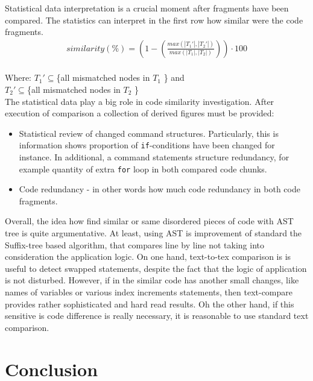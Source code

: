 \documentclass{report}
\begin{document}
Statistical data interpretation is a crucial moment after fragments have been compared. The statistics can interpret in the first row how similar were the code fragments. \\
\begin{gather*}
similarity(\%) =  \left ( 1 - \left (\frac{max(|T_{1}'|, |T_{2}'|)}{max(|T_{1}|, |T_{2}|)} \right ) \right )\cdot 100 
\end{gather*} \\
Where: $T_{1}' \subseteq $\{all mismatched nodes in $T_{1}$ \} and \\$T_{2}' \subseteq $\{all mismatched nodes in $T_{2}$ \}
\\
The statistical data play a big role in code similarity investigation. After execution of comparison a collection of derived figures must be provided:
\begin{itemize}
	\item Statistical review of changed command structures. Particularly, this is information shows proportion of \texttt{if}-conditions have been changed for instance. In additional, a command statements structure redundancy, for example quantity of extra \texttt{for} loop in both compared code chunks.
	\item Code redundancy - in other words how much code redundancy in both code fragments.
\end{itemize}
Overall, the idea how find similar or same disordered pieces of code with AST tree is quite argumentative. At least, using AST is improvement of standard the Suffix-tree based algorithm, that compares line by line not taking into consideration the application logic. On one hand, text-to-tex comparison is is useful to detect swapped statements, despite the fact that the logic of application is not disturbed. However, if in the similar code has another small changes, like names of variables or various index increments statements, then text-compare provides rather sophisticated and hard read results. Oh the other hand, if this sensitive is code difference is really necessary, it is reasonable to use standard text comparison.





\chapter{Conclusion}
\label{cha:Conclusion}
\end{document}
